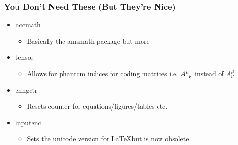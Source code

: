 \documentclass[fleqn, 11pt]{beamer}
\begin{document}
\begin{frame}
	\frametitle{You Don't Need These (But They're Nice)}
	
	\begin{itemize}
		\item<1-> nccmath
		\begin{itemize}
			\item<2-> Basically the amsmath package but more
		\end{itemize}
		
		\item<1-> tensor
		\begin{itemize}
			\item<3-> Allows for phantom indices for coding matrices i.e. $\tensor{A}{^\mu_\nu}$ instead of $A^\mu_\nu$
		\end{itemize}
		
		\item<1-> chngctr
		\begin{itemize}
			\item<4-> Resets counter for equations/figures/tables etc.
		\end{itemize}
		
		\item<1-> inputenc
		\begin{itemize}
			\item<5-> Sets the unicode version for \LaTeX but is now obsolete
		\end{itemize}
	\end{itemize}
\end{frame}
\end{document}
